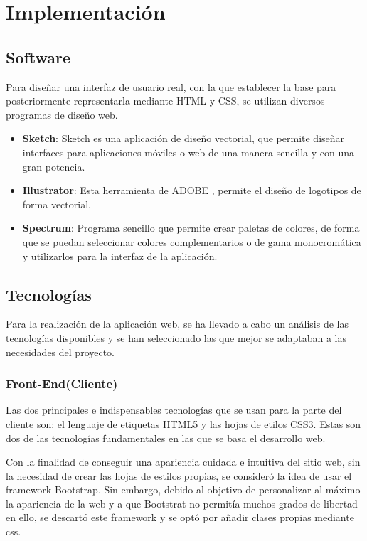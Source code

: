 \chapter{Implementación}

\section{Software}

Para diseñar una interfaz de usuario real, con la que establecer la base para posteriormente representarla mediante HTML y CSS, se utilizan diversos programas de diseño web.

\begin{itemize}

\item \textbf{Sketch}: Sketch es una aplicación de diseño vectorial, que permite diseñar interfaces para aplicaciones móviles o web de una manera sencilla y con una gran potencia.
\item \textbf{Illustrator}: Esta herramienta de ADOBE , permite el diseño de logotipos de forma vectorial,
\item \textbf{Spectrum}: Programa sencillo que permite crear paletas de colores, de forma que se puedan seleccionar colores complementarios o de gama monocromática y utilizarlos para la interfaz de la aplicación.

\end{itemize}

\section{Tecnologías}

Para la realización de la aplicación web, se ha llevado a cabo un análisis de las tecnologías disponibles y se han seleccionado las que mejor se adaptaban a las necesidades del proyecto.

\subsection{Front-End(Cliente)}

Las dos principales e indispensables tecnologías que se usan para la parte del cliente son: el lenguaje de etiquetas HTML5 y las hojas de etilos CSS3. Estas son dos de las tecnologías fundamentales en las que se basa el desarrollo web.

 \vspace{5 mm}

Con la finalidad de conseguir una apariencia cuidada e intuitiva del sitio web, sin la necesidad de crear las hojas de estilos propias, se consideró la idea de usar el framework Bootstrap. Sin embargo, debido al objetivo de personalizar al máximo la apariencia de la web y a que Bootstrat no permitía muchos grados de libertad en ello, se descartó este framework y se optó por añadir clases propias mediante css.


